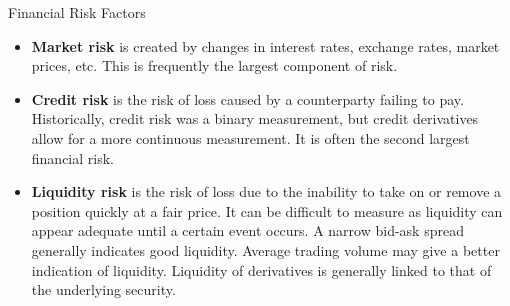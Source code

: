 \documentclass[../custom]{flashcards}
\begin{document}
\begin{flashcard}[\studyArea]{Financial Risk Factors}
    \begin{itemize}
        \item \textbf{Market risk} is created by changes in interest rates, exchange rates, market prices, etc. This is frequently the largest component of risk.
        \item \textbf{Credit risk} is the risk of loss caused by a counterparty failing to pay. Historically, credit risk was a binary measurement, but credit derivatives allow for a more continuous measurement. It is often the second largest financial risk.
        \item \textbf{Liquidity risk} is the risk of loss due to the inability to take on or remove a position quickly at a fair price. It can be difficult to measure as liquidity can appear adequate until a certain event occurs. A narrow bid-ask spread generally indicates good liquidity. Average trading volume may give a better indication of liquidity. Liquidity of derivatives is generally linked to that of the underlying security.
    \end{itemize}
\end{flashcard}
\end{document}
